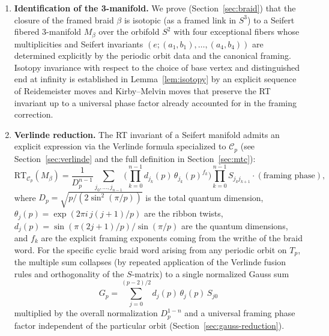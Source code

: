 \begin{enumerate}
\item[\textbf{Step 1.}] \textbf{Identification of the 3-manifold.} We prove (Section~\ref{sec:braid}) that the closure of the framed braid \(\beta\) is isotopic (as a framed link in \(S^3\)) to a Seifert fibered 3-manifold \(M_\beta\) over the orbifold \(S^2\) with four exceptional fibers whose multiplicities and Seifert invariants \((e; (a_1,b_1),\dots,(a_4,b_4))\) are determined explicitly by the periodic orbit data and the canonical framing. Isotopy invariance with respect to the choice of base vertex and distinguished end at infinity is established in Lemma~\ref{lem:isotopy} by an explicit sequence of Reidemeister moves and Kirby--Melvin moves that preserve the RT invariant up to a universal phase factor already accounted for in the framing correction.

\item[\textbf{Step 2.}] \textbf{Verlinde reduction.} The RT invariant of a Seifert manifold admits an explicit expression via the Verlinde formula specialized to \(\mathcal{C}_p\) (see Section~\ref{sec:verlinde} and the full definition in Section~\ref{sec:mtc}):
\[
\mathrm{RT}_{\mathcal{C}_p}(M_\beta) = \frac{1}{D_p^{n-1}} \sum_{j_0,\dots,j_{n-1}} \Biggl( \prod_{k=0}^{n-1} d_{j_k}(p) \, \theta_{j_k}(p)^{f_k} \Biggr) \prod_{k=0}^{n-1} S_{j_k j_{k+1}} \cdot (\text{framing phase}),
\]
where \(D_p = \sqrt{p/(2\sin^2(\pi/p))}\) is the total quantum dimension, \(\theta_j(p) = \exp(2\pi i \, j(j+1)/p)\) are the ribbon twists, \(d_j(p) = \sin(\pi(2j+1)/p)/\sin(\pi/p)\) are the quantum dimensions, and \(f_k\) are the explicit framing exponents coming from the writhe of the braid word. For the specific cyclic braid word arising from any periodic orbit on \(T_p\), the multiple sum collapses (by repeated application of the Verlinde fusion rules and orthogonality of the \(S\)-matrix) to a single normalized Gauss sum
\[
G_p = \sum_{j=0}^{(p-2)/2} d_j(p) \, \theta_j(p) \, S_{j0}
\]
multiplied by the overall normalization \(D_p^{1-n}\) and a universal framing phase factor independent of the particular orbit (Section~\ref{sec:gauss-reduction}).


\end{enumerate}
